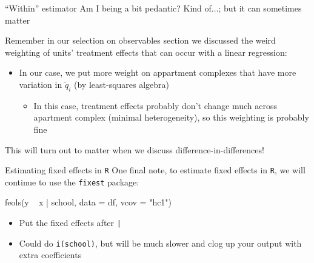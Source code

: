 \documentclass[aspectratio=169,t,11pt,table]{beamer}
\begin{document}


\begin{frame}{``Within'' estimator}
  Am I being a bit pedantic? Kind of...\pause; but it can sometimes matter

  \hugeskip
  Remember in our selection on observables section we discussed the weird weighting of units' treatment effects that can occur with a linear regression:
  \begin{itemize}
    \item In our case, we put more weight on appartment complexes that have more variation in $\tilde{q}_i$ (by least-squares algebra)
    
    \pause
    \begin{itemize}
      \item In this case, treatment effects probably don't change much across apartment complex (minimal heterogeneity), so this weighting is probably fine
    \end{itemize}
  \end{itemize}

  \bigskip
  This will turn out to matter when we discuss difference-in-differences!
\end{frame}

\begin{frame}[fragile]{Estimating fixed effects in \texttt{R}}
  One final note, to estimate fixed effects in \texttt{R}, we will continue to use the \texttt{fixest} package:

  \begin{codeblock}
feols(y ~ x | school, data = df, vcov = "hc1")
  \end{codeblock}

  \begin{itemize}
    \item Put the fixed effects after \texttt{|}
    
    \item Could do \texttt{i(school)}, but will be much slower and clog up your output with extra coefficients
  \end{itemize}
\end{frame}
\end{document}
